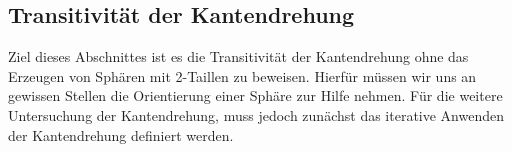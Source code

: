 \documentclass[12pt,titlepage,twoside,cleardoublepage]{article}
\theoremstyle{nummermitklammern}
\newtheorem{definition}[temp]{Definition}
\newtheorem{definition}[zahl]{Definition}
\numberwithin{equation}{section}
\begin{document}
 \subsection{Transitivität der Kantendrehung}

Ziel dieses Abschnittes ist es die Transitivität der Kantendrehung ohne das Erzeugen von Sphären mit 2-Taillen zu beweisen. Hierfür müssen wir uns an gewissen Stellen die Orientierung einer Sphäre zur Hilfe nehmen. 
Für die weitere Untersuchung der Kantendrehung, muss jedoch zunächst das iterative Anwenden der Kantendrehung definiert werden.
\end{document}
